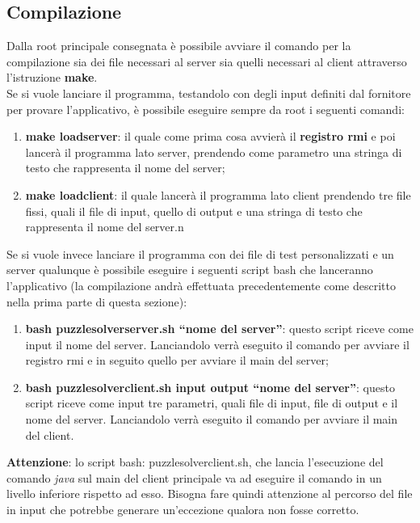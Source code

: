 	\subsection{Compilazione}
	Dalla root principale consegnata è possibile avviare il comando per la compilazione sia dei file necessari al server sia quelli necessari al client attraverso l'istruzione \textbf{make}. \\
	Se si vuole lanciare il programma, testandolo con degli input definiti dal fornitore per provare l'applicativo, è possibile eseguire sempre da root i seguenti comandi:
		\begin{enumerate}
			\item \textbf{make loadserver}: il quale come prima cosa avvierà il \textbf{registro rmi} e poi lancerà il programma lato server, prendendo come parametro una stringa di testo che rappresenta il nome del server;
			\item \textbf{make loadclient}: il quale lancerà il programma lato client prendendo tre file fissi, quali il file di input, quello di output e una stringa di testo che rappresenta il nome del server.n
		\end{enumerate}
	\noindent
	Se si vuole invece lanciare il programma con dei file di test personalizzati e un server qualunque è possibile eseguire i seguenti script bash che lanceranno l'applicativo (la compilazione andrà effettuata precedentemente come descritto nella prima parte di questa sezione):
	\begin{enumerate}
		\item \textbf{bash puzzlesolverserver.sh ``nome del server''}: questo script riceve come input il nome del server. Lanciandolo verrà eseguito il comando per avviare il registro rmi e in seguito quello per avviare il main del server;
		\item \textbf{bash puzzlesolverclient.sh input output ``nome del server''}: questo script riceve come input tre parametri, quali file di input, file di output e il nome del server. Lanciandolo verrà eseguito il comando per avviare il main del client.
	\end{enumerate}
	\noindent
	\textbf{Attenzione}: lo script bash: puzzlesolverclient.sh, che lancia l'esecuzione del comando \emph{java} sul main del client principale va ad eseguire il comando in un livello inferiore rispetto ad esso. Bisogna fare quindi attenzione al percorso del file in input che potrebbe generare un'eccezione qualora non fosse corretto.


